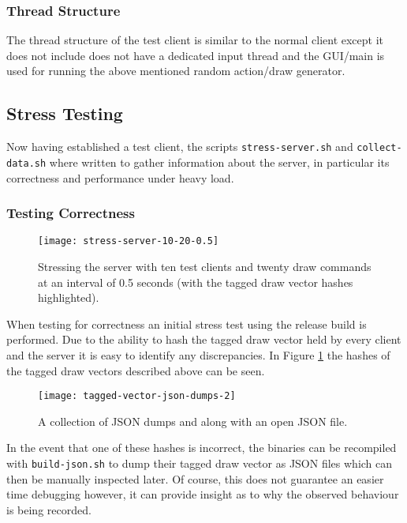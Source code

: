 \documentclass[article]{uom-coursework}
\begin{document}
\subsubsection{Thread Structure}

The thread structure of the test client is similar to the normal
client except it does not include does not have a dedicated
input thread and the GUI/main is used for running the above
mentioned random action/draw generator.

\subsection{Stress Testing}

Now having established a test client, the scripts
\texttt{stress-server.sh} and \texttt{collect-data.sh} where
written to gather information about the server, in particular
its correctness and performance under heavy load.

\subsubsection{Testing Correctness}

\begin{figure}[H]
\centering
\texttt{[image: stress-server-10-20-0.5]}
\caption{Stressing the server with ten test clients and twenty
draw commands at an interval of 0.5 seconds (with the tagged
draw vector hashes highlighted).}
\label{fig:stresstest1}
\end{figure}

When testing for correctness an initial stress test using the
release build is performed. Due to the ability to hash the
tagged draw vector held by every client and the server it is
easy to identify any discrepancies. In Figure
\ref{fig:stresstest1} the hashes of the tagged draw vectors
described above can be seen.

\begin{figure}[H]
\centering
\texttt{[image: tagged-vector-json-dumps-2]}
\caption{A collection of JSON dumps and along with an open JSON file.}
\label{fig:jsondump}
\end{figure}

In the event that one of these hashes is incorrect, the binaries
can be recompiled with \texttt{build-json.sh} to dump their
tagged draw vector as JSON files which can then be manually
inspected later. Of course, this does not guarantee an easier
time debugging however, it can provide insight as to why the
observed behaviour is being recorded.
\end{document}
